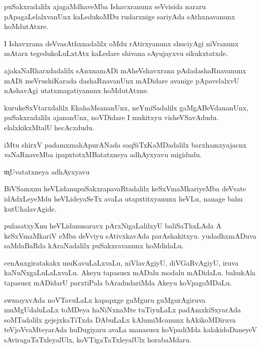\begin{mng}
puSakxradalilx ajagaMdhaveMba Ishavxranunx seVvisida  nararu pApagaLelalxvanUnx kaLedukoMDu rudarxnige sariyAda sAthxnavanunx hoMdutAtxre.
\end{mng}

\begin{mng}
I Ishavxrana deVvasAthxnadalilx oMdu rAtirxyanunx shuciyAgi niVranunx mAtarx tegedukoLuLxtAtx kaLedare shivana sAyujayxvu sikukxtatxde.
\end{mng}

\begin{mng}
ajakaNaRharxdadalilx sAnxnamADi mAheVshavxrana pAdadashaRnavanunx mADi meVrushiKarada dashaRnavanUnx mADidare avanige pApavelalxvU nAshavAgi utatxmagatiyanunx hoMdutAtxne.
\end{mng}

\begin{mng}
kurukeSxVtarxdalilx EkahaMsananUnx, neYmiSadalilx gaMgABeVdananUnx, puSakxradalilx ajananUnx, noVDidare I mukitxyu visheVSavAdudu. elalxkikxMtalU hecAcxdudu.
\end{mng}
iMtu shirxV padamxmahApurANada saqSiTxKaMDadalilx barxhamxyajacnx vaNaRnaveMba ipapxtotxMBatatxneya adhAyxyavu migidudu.

\begin{mng}
\c{mUvatatxneya adhAyxyavu}
\end{mng}

\begin{mng}
BiVSamxnu heVLidanu\mdash puSakxrapavaRtadalilx keSxVmaMkariyeMba deVvate idAdxLeyeMdu heVLideyaSeTx avaLa utapxtitxyanunx heVLu, nanage bahu kutUhalavAgide.
\end{mng}

\begin{mng}
pulasatxyXnu heVLidanu\mdash saravx pArxNigaLalilxyU baliSaThxLAda A keSxVmaMkariV eMba deVviyu sAtivxkavAda parAshakitxyu. yudadhxmADuva saMdaBaRda kAraNadalilx puSakxravanunx hoMdidaLu.
\end{mng}

\begin{mng}
cenAnxgiratakakx muKavuLaLxvaLu, niVlavAgiyU, diVGaRvAgiyU, iruva kaNuNxgaLuLaLxvaLu. Akeyu tapasusx mADalu modalu mADidaLu. bahukAla tapasusx mADidarU parxtiPala bAradudariMda Akeyu koVpagoMDaLu.
\end{mng}

\begin{mng}
swmayxvAda noVTavuLaLx kapapxge guMguru guMgurAgiruva muMgUdaluLaLx toMDeya haNiNxnaMte tuTiyuLaLx padAmxkiSxyarAda soMTadalilx gejejxkaTiTxda DAbuLaLx kAlumiMcanunx hAkikoMDiruva teVjoVvaMteyarAda huDugiyaru avaLa manasusx koVpadiMda kalakidoDaneyeV sAviragaTaTxleyalUlx, koVTigaTaTxleyalUlx horabaMdaru.
\end{mng}

